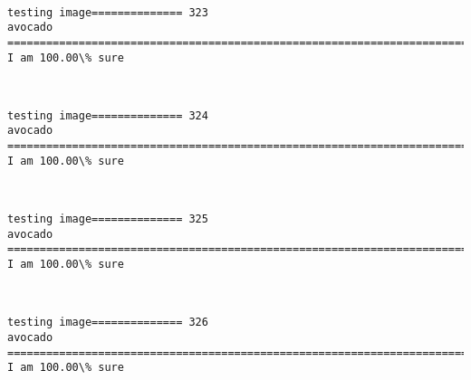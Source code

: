 \documentclass[11pt]{article}
\begin{document}
    \begin{center}
    \end{center}
    { \hspace*{\fill} \\}
    
    \begin{Verbatim}[commandchars=\\\{\}]
testing image============== 323
avocado
============================================================================
I am 100.00\% sure

    \end{Verbatim}

    \begin{center}
    \end{center}
    { \hspace*{\fill} \\}
    
    \begin{Verbatim}[commandchars=\\\{\}]
testing image============== 324
avocado
============================================================================
I am 100.00\% sure

    \end{Verbatim}

    \begin{center}
    \end{center}
    { \hspace*{\fill} \\}
    
    \begin{Verbatim}[commandchars=\\\{\}]
testing image============== 325
avocado
============================================================================
I am 100.00\% sure

    \end{Verbatim}

    \begin{center}
    \end{center}
    { \hspace*{\fill} \\}
    
    \begin{Verbatim}[commandchars=\\\{\}]
testing image============== 326
avocado
============================================================================
I am 100.00\% sure

    \end{Verbatim}
\end{document}
